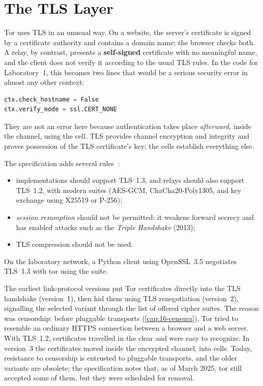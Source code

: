 \section{The TLS Layer}\label{sec:canale-tls}

Tor uses TLS in an unusual way. On a website, the server's certificate is signed by a certificate authority and contains a domain name; the browser checks both. A relay, by contrast, presents a \textbf{self-signed} certificate with no meaningful name, and the client does not verify it according to the usual TLS rules. In the code for Laboratory~1, this becomes two lines that would be a serious security error in almost any other context:
\begin{lstlisting}[language=Python,numbers=none]
ctx.check_hostname = False
ctx.verify_mode = ssl.CERT_NONE
\end{lstlisting}
They are not an error here because authentication takes place \emph{afterward}, inside the channel, using the  cell. TLS provides channel encryption and integrity and proves possession of the TLS certificate's key; the cells establish everything else.

The specification adds several rules~:
\begin{itemize}
  \item implementations should support TLS~1.3, and relays should also support TLS~1.2, with modern suites (AES-GCM, ChaCha20-Poly1305, and key exchange using X25519 or P-256);
  \item \emph{session resumption} should not be permitted: it weakens forward secrecy and has enabled attacks such as the \emph{Triple Handshake} (2013);
  \item TLS compression should not be used.
\end{itemize}
On the laboratory network, a Python client using OpenSSL~3.5 negotiates TLS~1.3 with tor using the  suite.

\begin{storia}
The earliest link-protocol versions put Tor certificates directly into the TLS handshake (version~1), then hid them using TLS renegotiation (version~2), signalling the selected variant through the list of offered cipher suites. The reason was censorship: before pluggable transports (\cref{cap:16-censura}), Tor tried to resemble an ordinary HTTPS connection between a browser and a web server. With TLS~1.2, certificates travelled in the clear and were easy to recognize. In version~3 the certificates moved inside the encrypted channel, into  cells. Today, resistance to censorship is entrusted to pluggable transports, and the older variants are obsolete; the specification notes that, as of March 2025, tor still accepted some of them, but they were scheduled for removal.
\end{storia}

